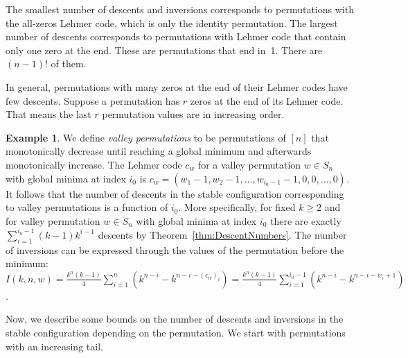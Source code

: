 \documentclass[final]{dmtcs-episciences}
\theoremstyle{definition}
\newtheorem{example}{Example}
\theoremstyle{remark}
\begin{document}
The smallest number of descents and inversions corresponds to permutations with the all-zeros Lehmer code, which is only the identity permutation. The largest number of descents corresponds to permutations with Lehmer code that contain only one zero at the end. These are permutations that end in~1. There are $(n-1)!$ of them.

In general, permutations with many zeros at the end of their Lehmer codes have few descents. Suppose a permutation has $r$ zeros at the end of its Lehmer code. That means the last $r$ permutation values are in increasing order.

\begin{example}
We define \textit{valley permutations} to be permutations of $[n]$ that monotonically decrease until reaching a global minimum and afterwards monotonically increase. The Lehmer code $c_w$ for a valley permutation $w \in S_n$ with global minima at index $i_0$ is $c_w = (w_1-1, w_2-1, \dots, w_{i_0-1}-1, 0, 0, \dots, 0)$. It follows that the number of descents in the stable configuration corresponding to valley permutations is a function of $i_0$. More specifically, for fixed $k \geq 2$ and for valley permutation $w \in S_n$ with global minima at index $i_0$ there are exactly $\sum_{i=1}^{i_0-1} (k-1)k^{i-1}$ descents by Theorem~\ref{thm:DescentNumbers}. The number of inversions can be expressed through the values of the permutation before the minimum: $I(k, n, w) = \frac{k^n(k-1)}{4}\sum_{i=1}^n (k^{n-i} - k^{n-i-(c_w)_i}) = \frac{k^n(k-1)}{4}\sum_{i=1}^{i_0-1}(k^{n-i} - k^{n-i-w_i+1})$. 
\end{example}

Now, we describe some bounds on the number of descents and inversions in the stable configuration depending on the permutation. We start with permutations with an increasing tail.
\end{document}
